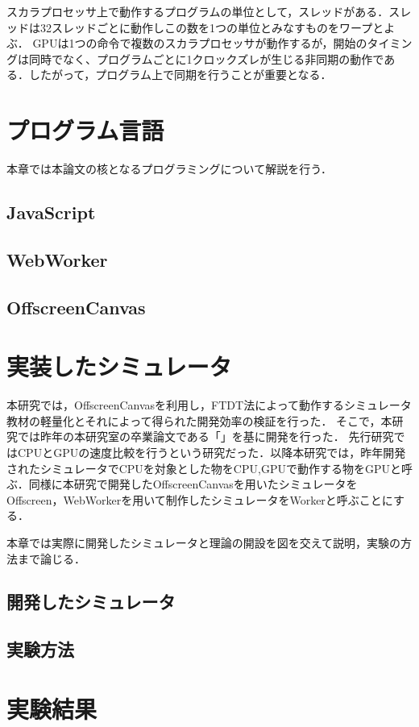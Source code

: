 \documentclass[a4j,12pt]{jsarticle}
\begin{document}
スカラプロセッサ上で動作するプログラムの単位として，スレッドがある．スレッドは32スレッドごとに動作しこの数を1つの単位とみなすものをワープとよぶ．
GPUは1つの命令で複数のスカラプロセッサが動作するが，開始のタイミングは同時でなく、プログラムごとに1クロックズレが生じる非同期の動作である．したがって，プログラム上で同期を行うことが重要となる．
\newpage

\section{プログラム言語}
本章では本論文の核となるプログラミングについて解説を行う．
\subsection{JavaScript}
\subsection{WebWorker}
\subsection{OffscreenCanvas}
\newpage

\section{実装したシミュレータ}
本研究では，OffscreenCanvasを利用し，FTDT法によって動作するシミュレータ教材の軽量化とそれによって得られた開発効率の検証を行った．
そこで，本研究では昨年の本研究室の卒業論文である「」を基に開発を行った．
先行研究ではCPUとGPUの速度比較を行うという研究だった．以降本研究では，昨年開発されたシミュレータでCPUを対象とした物をCPU,GPUで動作する物をGPUと呼ぶ．同様に本研究で開発したOffscreenCanvasを用いたシミュレータをOffscreen，WebWorkerを用いて制作したシミュレータをWorkerと呼ぶことにする．

本章では実際に開発したシミュレータと理論の開設を図を交えて説明，実験の方法まで論じる．
\subsection{開発したシミュレータ}
\subsection{実験方法}
\newpage

\section{実験結果}
\newpage
\end{document}
